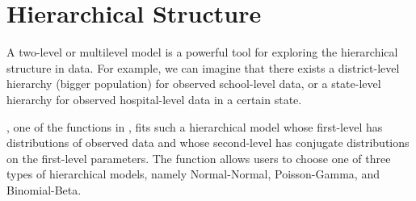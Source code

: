 \documentclass[article]{jss}
\begin{document}

\section[Hierarchical Structure]{Hierarchical Structure} \label{hierarchical}
A two-level or multilevel model is a powerful tool for exploring the hierarchical structure in data. For example, we can imagine that there exists a district-level hierarchy (bigger population) for observed school-level data, or a state-level hierarchy for observed hospital-level data in a certain state. 



, one of the functions in , fits such a hierarchical model whose first-level has distributions of observed data and whose second-level has conjugate distributions on the first-level parameters. The  function allows users to choose one of three types of hierarchical models, namely Normal-Normal, Poisson-Gamma, and Binomial-Beta. 
 
\end{document}
